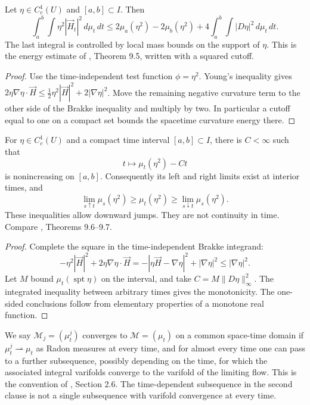 \begin{proposition}\label{prop:brakke-local-energy}
Let $\eta\in C_c^1(U)$ and $[a,b]\subset I$. Then
\[
 \int_a^b\int\eta^2|\vec H_t|^2\,d\mu_t\,dt
 \leq2\mu_a(\eta^2)-2\mu_b(\eta^2)
 +4\int_a^b\int|D\eta|^2\,d\mu_t\,dt.
\]
The last integral is controlled by local mass bounds on the support of $\eta$. This is the energy estimate of \cite{WhiMCF15}, Theorem 9.5, written with a squared cutoff.
\end{proposition}
\begin{proof}
Use the time-independent test function $\phi=\eta^2$. Young's inequality gives
$2\eta\nabla\eta\cdot\vec H\leq\frac12\eta^2|\vec H|^2+2|\nabla\eta|^2$.
Move the remaining negative curvature term to the other side of the Brakke inequality and multiply by two. In particular a cutoff equal to one on a compact set bounds the spacetime curvature energy there.
\end{proof}

\begin{proposition}\label{prop:brakke-time-semicontinuity}
For $\eta\in C_c^1(U)$ and a compact time interval $[a,b]\subset I$, there is $C<\infty$ such that
\[
 t\longmapsto\mu_t(\eta^2)-Ct
\]
is nonincreasing on $[a,b]$. Consequently its left and right limits exist at interior times, and
\[
 \lim_{s\uparrow t}\mu_s(\eta^2)\geq\mu_t(\eta^2)
 \geq\lim_{s\downarrow t}\mu_s(\eta^2).
\]
These inequalities allow downward jumps. They are not continuity in time. Compare \cite{WhiMCF15}, Theorems 9.6--9.7.
\end{proposition}
\begin{proof}
Complete the square in the time-independent Brakke integrand:
\[
 -\eta^2|\vec H|^2+2\eta\nabla\eta\cdot\vec H
 =-|\eta\vec H-\nabla\eta|^2+|\nabla\eta|^2\leq|\nabla\eta|^2.
\]
Let $M$ bound $\mu_t(\operatorname{spt}\eta)$ on the interval, and take $C=M\|D\eta\|_\infty^2$. The integrated inequality between arbitrary times gives the monotonicity. The one-sided conclusions follow from elementary properties of a monotone real function.
\end{proof}

\begin{definition}\label{def:brakke-convergence}
We say $\mathcal M_j=(\mu^j_t)$ converges to $\mathcal M=(\mu_t)$ on a common space-time domain if $\mu^j_t\rightharpoonup\mu_t$ as Radon measures at every time, and for almost every time one can pass to a further subsequence, possibly depending on the time, for which the associated integral varifolds converge to the varifold of the limiting flow. This is the convention of \cite{CCMS20}, Section 2.6. The time-dependent subsequence in the second clause is not a single subsequence with varifold convergence at every time.
\end{definition}

